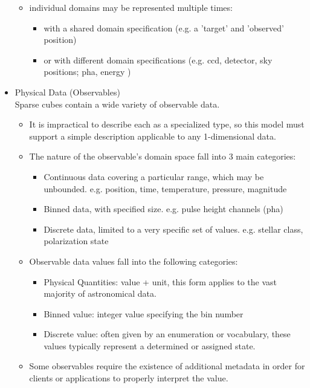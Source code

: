 \documentclass[11pt,a4paper]{ivoa}
\begin{document}
\begin{itemize}
\begin{itemize}
       \item individual domains may be represented multiple times:
         \begin{itemize}
            \item with a shared domain specification (e.g. a 'target' and 'observed' position)
            \item or with different domain specifications (e.g. ccd, detector, sky positions;  pha, energy )
         \end{itemize}
    \end{itemize}
    \item Physical Data (Observables) \\
       Sparse cubes contain a wide variety of observable data.
    \begin{itemize}
       \item It is impractical to describe each as a specialized type, so this model must support a simple description applicable to any 1-dimensional data.
       \item The nature of the observable's domain space fall into 3 main categories:
         \begin{itemize}
            \item Continuous data covering a particular range, which may be unbounded.  e.g. position, time, temperature, pressure, magnitude
            \item Binned data, with specified size.  e.g. pulse height channels (pha)
            \item Discrete data, limited to a very specific set of values. e.g. stellar class, polarization state
         \end{itemize}
       \item Observable data values fall into the following categories:
         \begin{itemize}
            \item Physical Quantities: value + unit, this form applies to the vast majority of astronomical data.
            \item Binned value: integer value specifying the bin number
            \item Discrete value: often given by an enumeration or vocabulary, these values typically represent a determined or assigned state.
         \end{itemize}
       \item Some observables require the existence of additional metadata in order for clients or applications to properly interpret the value.

\end{itemize}
\end{itemize}
\end{document}
